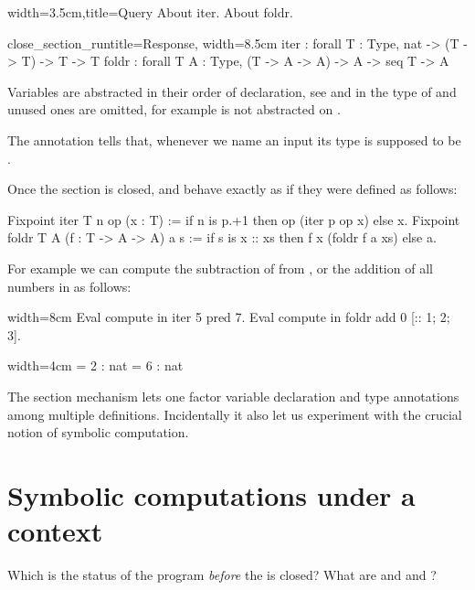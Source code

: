 \begin{coq}{}{width=3.5cm,title=Query}
About iter.
About foldr.
$~$
\end{coq}
\begin{coqout}{close_section_run}{title=Response, width=8.5cm}
iter : forall T : Type, nat -> (T -> T) -> T -> T
foldr :
  forall T A : Type, (T -> A -> A) -> A -> seq T -> A
\end{coqout}

Variables are abstracted in their order of declaration, see  and 
in the type of  and unused ones are omitted, for example 
is not abstracted on .

The  annotation tells \Coq{} that, whenever we name
an input  its type is supposed to be .

Once the section is closed,  and  behave exactly as
if they were defined as follows:

\begin{coq}{}{}
Fixpoint iter T n op (x : T) :=
  if n is p.+1 then op (iter p op x) else x.
Fixpoint foldr T A (f : T -> A -> A) a s :=
  if s is x :: xs then f x (foldr f a xs) else a.
\end{coq}

For example we can compute the subtraction of  from , or the 
addition of all numbers in \C{[:: 1; 2; 3]}
as follows:

\begin{coq}{}{width=8cm}
Eval compute in iter 5 pred 7.
Eval compute in foldr add 0 [:: 1; 2; 3].
\end{coq}
\begin{coqout}{}{width=4cm}
 = 2 : nat
 = 6 : nat
\end{coqout}

The section mechanism lets one factor variable declaration and type
annotations among multiple definitions.  Incidentally it also let us
experiment with the crucial notion of symbolic computation.

\section{Symbolic computations under a context}

Which is the status of the  program \emph{before} the
 is closed?  What are  and  and ?

